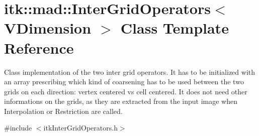 \hypertarget{classitk_1_1mad_1_1_inter_grid_operators}{\section{itk\-:\-:mad\-:\-:Inter\-Grid\-Operators$<$ V\-Dimension $>$ Class Template Reference}
\label{classitk_1_1mad_1_1_inter_grid_operators}
}


Class implementation of the two inter grid operators. It has to be initialized with an array prescribing which kind of coarsening has to be used between the two grids on each direction\-: vertex centered vs cell centered. It does not need other informations on the grids, as they are extracted from the input image when Interpolation or Restriction are called.  




{\ttfamily \#include $<$itk\-Inter\-Grid\-Operators.\-h$>$}

